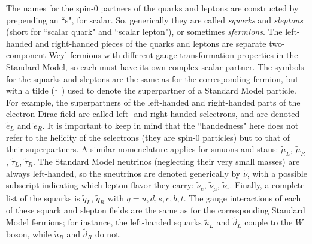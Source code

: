 \documentclass[11pt]{article}
\def\stilde{\widetilde}
\begin{document}
The names 
for the spin-0 partners of the quarks and leptons are constructed by 
prepending an ``s", for scalar. So, generically they are called {\it 
squarks} and {\it sleptons} (short for ``scalar quark" and ``scalar 
lepton"), or sometimes {\it sfermions}. 
The left-handed and right-handed pieces of the quarks and 
leptons are separate two-component Weyl fermions with different gauge 
transformation properties in the Standard Model, so each must have its own 
complex scalar partner. The symbols for the squarks and sleptons are the 
same as for the corresponding fermion, but with a tilde 
($\phantom{.}\stilde{\phantom{.}}\phantom{.}$) 
used to denote the superpartner of a Standard 
Model particle. For example, the superpartners of the left-handed and 
right-handed parts of the electron Dirac field are called left- and 
right-handed selectrons, and are denoted $\stilde e_L$ and $\stilde e_R$. 
It is important to keep in mind that the ``handedness" here does not refer 
to the helicity of the selectrons (they are spin-0 particles) but to that 
of their superpartners. A similar nomenclature applies for smuons and 
staus: $\stilde \mu_L$, $\stilde\mu_R$, $\stilde\tau_L$, $\stilde \tau_R$. 
The Standard Model neutrinos (neglecting their very small masses) are 
always left-handed, so the sneutrinos are denoted generically by 
$\stilde\nu$, with a possible subscript indicating which lepton flavor 
they carry: $\stilde\nu_e$, $\stilde\nu_\mu$, $\stilde\nu_\tau$. Finally, 
a complete list of the squarks is $\stilde q_L$, $\stilde q_R$ with 
$q=u,d,s,c,b,t$. The gauge interactions of each of these squark and 
slepton fields are the same as for the corresponding Standard Model 
fermions; for instance, the left-handed squarks $\stilde u_L$ and $\stilde 
d_L$ couple to the $W$ boson, while $\stilde u_R$ and $\stilde d_R$ do 
not.\setcounter{footnote}{1}
\end{document}
